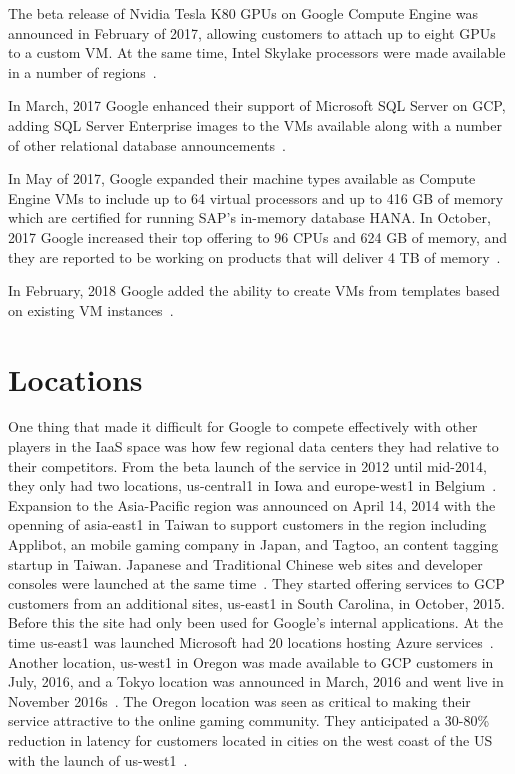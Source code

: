 The beta release of Nvidia Tesla K80 GPUs on Google Compute Engine was
announced in February of 2017, allowing customers to attach up to
eight GPUs to a custom VM. At the same time, Intel Skylake processors
were made available in a number of
regions~\cite{hid-sp18-419-googleblog20170221}.

In March, 2017 Google enhanced their support of Microsoft SQL Server
on GCP, adding SQL Server Enterprise images to the VMs available along
with a number of other relational database
announcements~\cite{hid-sp18-419-googleblog20170309}.

In May of 2017, Google expanded their machine types available as
Compute Engine VMs to include up to 64 virtual processors and up to
416 GB of memory which are certified for running SAP's in-memory
database HANA. In October, 2017 Google increased their top offering to
96 CPUs and 624 GB of memory, and they are reported to be working on
products that will deliver 4 TB of
memory~\cite{hid-sp18-419-techcrunch-gce-20171005}.

In February, 2018 Google added the ability to create VMs from
templates based on existing VM
instances~\cite{hid-sp18-419-googleblog20180222}.

\section{Locations}
One thing that made it difficult for Google to compete effectively
with other players in the IaaS space was how few regional data centers
they had relative to their competitors. From the beta launch of the
service in 2012 until mid-2014, they only had two locations,
us-central1 in Iowa and europe-west1 in
Belgium~\cite{hid-sp18-419-gcp-history-medium}. Expansion to the
Asia-Pacific region was announced on April 14, 2014 with the openning
of asia-east1 in Taiwan to support customers in the region including
Applibot, an mobile gaming company in Japan, and Tagtoo, an content
tagging startup in Taiwan. Japanese and Traditional Chinese web sites
and developer consoles were launched at the same
time~\cite{hid-sp18-419-googleblog20140414}. They started offering
services to GCP customers from an additional sites, us-east1 in South
Carolina, in October, 2015. Before this the site had only been used
for Google's internal applications. At the time us-east1 was launched
Microsoft had 20 locations hosting Azure
services~\cite{hid-sp18-419-techcrunch-gcp-20151001}. Another location,
us-west1 in Oregon was made available to GCP customers in July, 2016,
and a Tokyo location was announced in March, 2016 and went live in
November 2016s~\cite{hid-sp18-419-googleblog20161108}. The Oregon
location was seen as critical to making their service attractive to
the online gaming community. They anticipated a 30-80\% reduction in
latency for customers located in cities on the west coast of the US
with the launch of us-west1~\cite{hid-sp18-419-googleblog20160720}.

